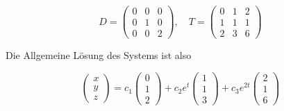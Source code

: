 \begin{solution}
    \vspace{1\baselineskip}

    \begin{equation*}
        D = \begin{pmatrix}
            0 & 0 & 0 \\
            0 & 1 & 0 \\
            0 & 0 & 2
        \end{pmatrix}, \quad
        T = \begin{pmatrix}
            0 & 1 & 2 \\
            1 & 1 & 1 \\
            2 & 3 & 6
        \end{pmatrix}
    \end{equation*}

    \vspace{1\baselineskip}

    Die Allgemeine Lösung des Systems ist also

    \begin{equation*}
        \begin{pmatrix}
            x \\
            y \\
            z
        \end{pmatrix} = c_1 \begin{pmatrix} 0 \\ 1 \\ 2 \end{pmatrix} + c_2 e^{t} \begin{pmatrix} 1 \\ 1 \\ 3 \end{pmatrix} + c_3 e^{2t} \begin{pmatrix} 2 \\ 1 \\ 6 \end{pmatrix}
    \end{equation*}

\end{solution}